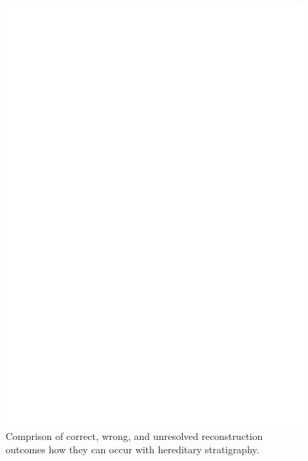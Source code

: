 \begin{figure}
  \centering
  \includegraphics[width=\linewidth]{img/hstrat-failure-modes}
  \caption{%
    Comprison of correct, wrong, and unresolved reconstruction outcomes how they can occur with hereditary stratigraphy.
  }
  \label{fig:steady-vs-tilted}
\end{figure}
